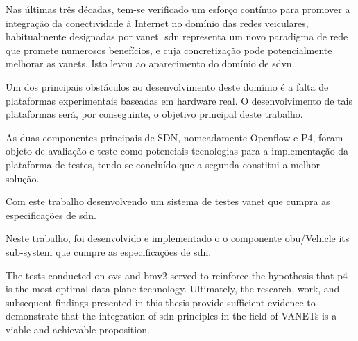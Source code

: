 
%


Nas últimas três décadas, tem-se verificado um esforço contínuo para promover a integração da conectividade à Internet no domínio das redes veiculares, habitualmente designadas por \gls{vanet}. \gls{sdn} representa um novo paradigma de rede que promete numerosos benefícios, e cuja concretização pode potencialmente melhorar as \glspl{vanet}. Isto levou ao aparecimento do domínio de \gls{sdvn}.

Um dos principais obstáculos ao desenvolvimento deste domínio é a falta de plataformas experimentais baseadas em hardware real. O desenvolvimento de tais plataformas será, por conseguinte, o objetivo principal deste trabalho.

As duas componentes principais de SDN, nomeadamente Openflow e P4, foram objeto de avaliação e teste como potenciais tecnologias para a implementação da plataforma de testes, tendo-se concluído que a segunda constitui a melhor solução.

Com este trabalho desenvolvendo um sistema de testes \gls{vanet} que cumpra as especificações de \gls{sdn}. %

Neste trabalho, foi desenvolvido e implementado o o componente \gls{obu}/Vehicle \gls{its} sub-system que cumpre as especificações de \gls{sdn}. 

The tests conducted on \gls{ovs} and \gls{bmv2} served to reinforce the hypothesis that \gls{p4} is the most optimal data plane technology. 
Ultimately, the research, work, and subsequent findings presented in this thesis provide sufficient evidence to demonstrate that the integration of \gls{sdn} principles in the field of VANETs is a viable and achievable proposition.





